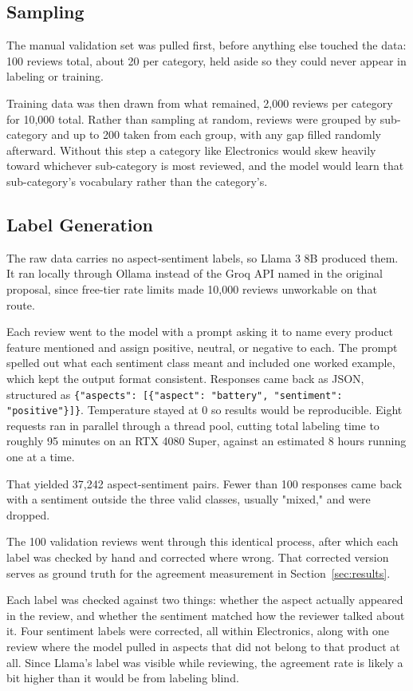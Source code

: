 \documentclass[sigconf]{acmart}
\begin{document}
\subsection{Sampling}
The manual validation set was pulled first, before anything else touched the data: 100 reviews total, about 20 per category, held aside so they could never appear in labeling or training.

Training data was then drawn from what remained, 2,000 reviews per category for 10,000 total. Rather than sampling at random, reviews were grouped by sub-category and up to 200 taken from each group, with any gap filled randomly afterward. Without this step a category like Electronics would skew heavily toward whichever sub-category is most reviewed, and the model would learn that sub-category's vocabulary rather than the category's.

\subsection{Label Generation}
The raw data carries no aspect-sentiment labels, so Llama 3 8B produced them. It ran locally through Ollama instead of the Groq API named in the original proposal, since free-tier rate limits made 10,000 reviews unworkable on that route.

Each review went to the model with a prompt asking it to name every product feature mentioned and assign positive, neutral, or negative to each. The prompt spelled out what each sentiment class meant and included one worked example, which kept the output format consistent. Responses came back as JSON, structured as \texttt{\{"aspects": [\{"aspect": "battery", "sentiment": "positive"\}]\}}. Temperature stayed at 0 so results would be reproducible. Eight requests ran in parallel through a thread pool, cutting total labeling time to roughly 95 minutes on an RTX 4080 Super, against an estimated 8 hours running one at a time.

That yielded 37,242 aspect-sentiment pairs. Fewer than 100 responses came back with a sentiment outside the three valid classes, usually "mixed," and were dropped.

The 100 validation reviews went through this identical process, after which each label was checked by hand and corrected where wrong. That corrected version serves as ground truth for the agreement measurement in Section~\ref{sec:results}.

Each label was checked against two things: whether the aspect actually appeared in the review, and whether the sentiment matched how the reviewer talked about it. Four sentiment labels were corrected, all within Electronics, along with one review where the model pulled in aspects that did not belong to that product at all. Since Llama's label was visible while reviewing, the agreement rate is likely a bit higher than it would be from labeling blind.
\end{document}
